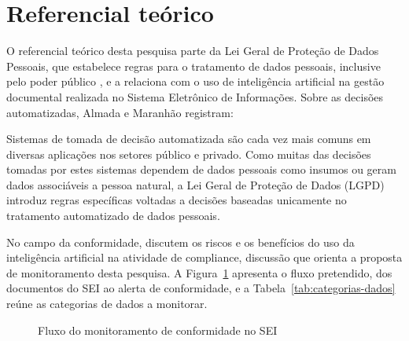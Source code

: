 
\section{Referencial teórico}

O referencial teórico desta pesquisa parte da Lei Geral de Proteção de Dados
Pessoais, que estabelece regras para o tratamento de dados pessoais, inclusive
pelo poder público \parencite{brasil2018}, e a relaciona com o uso de
inteligência artificial na gestão documental realizada no Sistema Eletrônico de
Informações. Sobre as decisões automatizadas, Almada e Maranhão registram:

\begin{citacao}
Sistemas de tomada de decisão automatizada são cada vez mais comuns em diversas
aplicações nos setores público e privado. Como muitas das decisões tomadas por
estes sistemas dependem de dados pessoais como insumos ou geram dados
associáveis a pessoa natural, a Lei Geral de Proteção de Dados (LGPD) introduz
regras específicas voltadas a decisões baseadas unicamente no tratamento
automatizado de dados pessoais. \parencite{almada2023}
\end{citacao}

No campo da conformidade,  discutem os riscos e os
benefícios do uso da inteligência artificial na atividade de compliance,
discussão que orienta a proposta de monitoramento desta pesquisa. A
Figura~\ref{fig:fluxo-monitoramento} apresenta o fluxo pretendido, dos
documentos do SEI ao alerta de conformidade, e a
Tabela~\ref{tab:categorias-dados} reúne as categorias de dados a monitorar.

\begin{figure}[htb]
  \caption{Fluxo do monitoramento de conformidade no SEI}
  \label{fig:fluxo-monitoramento}
  \centering
\end{figure}

